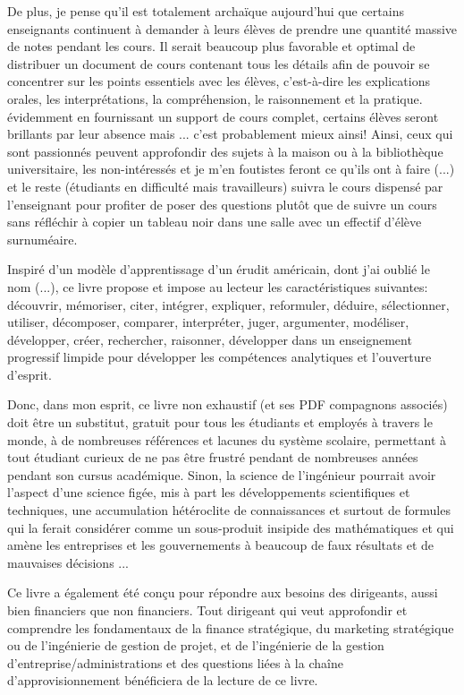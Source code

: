 	De plus, je pense qu'il est totalement archaïque aujourd'hui que certains enseignants continuent à demander à leurs \'elèves de prendre une quantit\'e massive de notes pendant les cours. Il serait beaucoup plus favorable et optimal de distribuer un document de cours contenant tous les d\'etails afin de pouvoir se concentrer sur les points essentiels avec les \'elèves, c'est-à-dire les explications orales, les interpr\'etations, la compr\'ehension, le raisonnement et la pratique. \'evidemment en fournissant un support de cours complet, certains \'elèves seront brillants par leur absence mais ... c'est probablement mieux ainsi! Ainsi, ceux qui sont passionn\'es peuvent approfondir des sujets à la maison ou à la bibliothèque universitaire, les non-int\'eress\'es et je m'en foutistes feront ce qu'ils ont à faire (...) et le reste (\'etudiants en difficult\'e mais travailleurs) suivra le cours dispens\'e par l'enseignant pour profiter de poser des questions plutôt que de suivre un cours sans r\'efl\'echir à copier un tableau noir dans une salle avec un effectif d'\'elève surnum\'eaire.
	
	Inspir\'e d'un modèle d'apprentissage d'un \'erudit am\'ericain, dont j'ai oubli\'e le nom (...), ce livre propose et impose au lecteur les caract\'eristiques suivantes: d\'ecouvrir, m\'emoriser, citer, int\'egrer, expliquer, reformuler, d\'eduire, s\'electionner, utiliser, d\'ecomposer, comparer, interpr\'eter, juger, argumenter, mod\'eliser, d\'evelopper, cr\'eer, rechercher, raisonner, d\'evelopper dans un  enseignement progressif limpide pour d\'evelopper les comp\'etences analytiques et l'ouverture d'esprit.

	Donc, dans mon esprit, ce livre non exhaustif (et ses PDF compagnons associ\'es) doit être un substitut, gratuit pour tous les \'etudiants et employ\'es à travers le monde, à de nombreuses r\'ef\'erences et lacunes du système scolaire, permettant à tout \'etudiant curieux de ne pas être frustr\'e pendant de nombreuses ann\'ees pendant son cursus acad\'emique. Sinon, la science de l'ing\'enieur pourrait avoir l'aspect d'une science fig\'ee, mis à part les d\'eveloppements scientifiques et techniques, une accumulation h\'et\'eroclite de connaissances et surtout de formules qui la ferait consid\'erer comme un sous-produit insipide des math\'ematiques et qui amène les entreprises et les gouvernements à beaucoup de faux r\'esultats et de mauvaises d\'ecisions ...
	
	Ce livre a \'egalement \'et\'e conçu pour r\'epondre aux besoins des dirigeants, aussi bien financiers que non financiers. Tout dirigeant qui veut approfondir et comprendre les fondamentaux de la finance strat\'egique, du marketing strat\'egique ou de l'ing\'enierie de gestion de projet, et de l'ing\'enierie de la gestion d'entreprise/administrations et des questions li\'ees à la chaîne d'approvisionnement b\'en\'eficiera de la lecture de ce livre.
	

